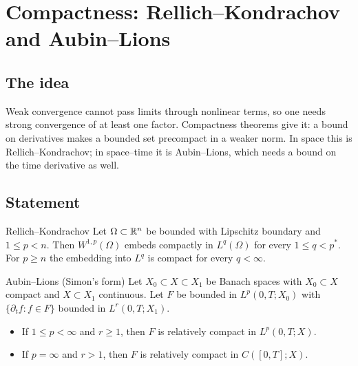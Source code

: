 
\section{Compactness: Rellich--Kondrachov and Aubin--Lions}\label{p:compactness}


\subsection*{The idea}

Weak convergence cannot pass limits through nonlinear terms, so one needs strong convergence of at least one factor. Compactness theorems give it: a bound on derivatives makes a bounded set precompact in a weaker norm. In space this is Rellich--Kondrachov; in space--time it is Aubin--Lions, which needs a bound on the time derivative as well.

\subsection*{Statement}

\begin{thmbox}{Rellich--Kondrachov}
%
Let $\Omega\subset\mathbb{R}^n$ be bounded with Lipschitz boundary and $1\le p< n$. Then $W^{1,p}(\Omega)$ embeds compactly in $L^q(\Omega)$ for every $1\le q< p^*$. For $p\ge n$ the embedding into $L^q$ is compact for every $q< \infty$.
\end{thmbox}

\begin{thmbox}{Aubin--Lions (Simon's form)}
%
Let $X_0\subset X\subset X_1$ be Banach spaces with $X_0\subset X$ compact and $X\subset X_1$ continuous. Let $F$ be bounded in $L^p(0,T;X_0)$ with $\{\partial_t f: f\in F\}$ bounded in $L^r(0,T;X_1)$.

\begin{itemize}
\item If $1\le p< \infty$ and $r\ge1$, then $F$ is relatively compact in $L^p(0,T;X)$.
\item If $p=\infty$ and $r> 1$, then $F$ is relatively compact in $C([0,T];X)$.
\end{itemize}
\end{thmbox}

